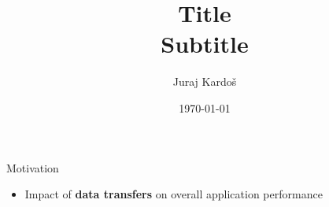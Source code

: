 \documentclass[aspectratio=169]{beamer}
\title[Title footnote]{\textbf{Title}\\[0.5em] Subtitle}
\author{Juraj Kardo\v{s}}
\institute{(University of Lugano)}
\date{\today}
\begin{document}
\begin{frame}
\titlepage
\end{frame}

\begin{frame}[fragile]{Motivation}

\begin{itemize}
\item Impact of \textbf{data transfers} on overall application performance
\end{itemize}


\end{frame}
\end{document}

